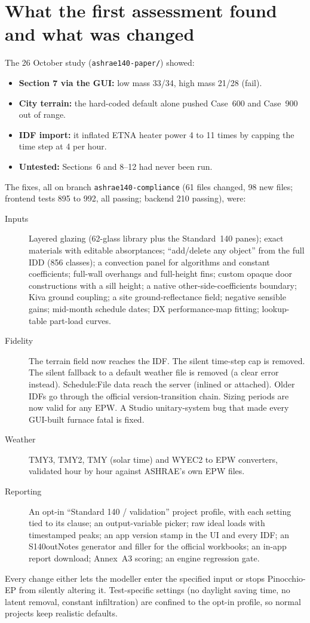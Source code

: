 \documentclass[10pt,a4paper]{article}
\newcommand{\code}[1]{\texttt{\small #1}}
\begin{document}
\section{What the first assessment found and what was changed}
The 26 October study (\code{ashrae140-paper/}) showed:
\begin{itemize}
\item \textbf{Section 7 via the GUI:} low mass 33/34, high mass 21/28 (fail).
\item \textbf{City terrain:} the hard-coded default alone pushed Case~600 and Case~900 out of range.
\item \textbf{IDF import:} it inflated ETNA heater power 4 to 11 times by capping the time step at 4 per hour.
\item \textbf{Untested:} Sections~6 and 8--12 had never been run.
\end{itemize}
The fixes, all on branch \code{ashrae140-compliance} (61 files changed, 98 new files; frontend tests 895 to 992,
all passing; backend 210 passing), were:
\begin{description}
\item[Inputs] Layered glazing (62-glass library plus the Standard~140 panes); exact materials with editable
absorptances; ``add/delete any object'' from the full IDD (856 classes); a convection panel for algorithms and
constant coefficients; full-wall overhangs and full-height fins; custom opaque door constructions with a sill
height; a native other-side-coefficients boundary; Kiva ground coupling; a site ground-reflectance field; negative
sensible gains; mid-month schedule dates; DX performance-map fitting; lookup-table part-load curves.
\item[Fidelity] The terrain field now reaches the IDF. The silent time-step cap is removed. The silent fallback to
a default weather file is removed (a clear error instead). Schedule:File data reach the server (inlined or attached).
Older IDFs go through the official version-transition chain. Sizing periods are now valid for any EPW. A Studio
unitary-system bug that made every GUI-built furnace fatal is fixed.
\item[Weather] TMY3, TMY2, TMY (solar time) and WYEC2 to EPW converters, validated hour by hour against ASHRAE's own
EPW files.
\item[Reporting] An opt-in ``Standard 140 / validation'' project profile, with each setting tied to its clause; an
output-variable picker; raw ideal loads with timestamped peaks; an app version stamp in the UI and every IDF; an
S140outNotes generator and filler for the official workbooks; an in-app report download; Annex~A3 scoring; an
engine regression gate.
\end{description}
Every change either lets the modeller enter the specified input or stops Pinocchio-EP from silently altering it.
Test-specific settings (no daylight saving time, no latent removal, constant infiltration) are confined to the
opt-in profile, so normal projects keep realistic defaults.
\end{document}
